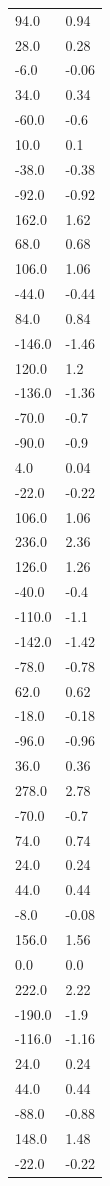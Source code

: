\begin{longtable}{ll}
94.0 & 0.94 \\
28.0 & 0.28 \\
-6.0 & -0.06 \\
34.0 & 0.34 \\
-60.0 & -0.6 \\
10.0 & 0.1 \\
-38.0 & -0.38 \\
-92.0 & -0.92 \\
162.0 & 1.62 \\
68.0 & 0.68 \\
106.0 & 1.06 \\
-44.0 & -0.44 \\
84.0 & 0.84 \\
-146.0 & -1.46 \\
120.0 & 1.2 \\
-136.0 & -1.36 \\
-70.0 & -0.7 \\
-90.0 & -0.9 \\
4.0 & 0.04 \\
-22.0 & -0.22 \\
106.0 & 1.06 \\
236.0 & 2.36 \\
126.0 & 1.26 \\
-40.0 & -0.4 \\
-110.0 & -1.1 \\
-142.0 & -1.42 \\
-78.0 & -0.78 \\
62.0 & 0.62 \\
-18.0 & -0.18 \\
-96.0 & -0.96 \\
36.0 & 0.36 \\
278.0 & 2.78 \\
-70.0 & -0.7 \\
74.0 & 0.74 \\
24.0 & 0.24 \\
44.0 & 0.44 \\
-8.0 & -0.08 \\
156.0 & 1.56 \\
0.0 & 0.0 \\
222.0 & 2.22 \\
-190.0 & -1.9 \\
-116.0 & -1.16 \\
24.0 & 0.24 \\
44.0 & 0.44 \\
-88.0 & -0.88 \\
148.0 & 1.48 \\
-22.0 & -0.22 \\

\end{longtable}
